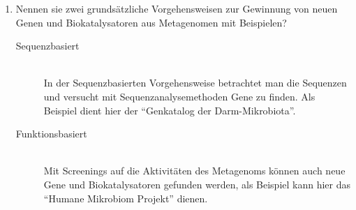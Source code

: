 \begin{enumerate}
	\item Nennen sie zwei grundsätzliche Vorgehensweisen zur Gewinnung von neuen Genen und Biokatalysatoren aus Metagenomen mit Beispielen?

		\begin{description}
			\item[Sequenzbasiert] \hfill \\
				In der Sequenzbasierten Vorgehensweise betrachtet man die Sequenzen und versucht
				mit Sequenzanalysemethoden Gene zu finden.
				Als Beispiel dient hier der ``Genkatalog der Darm-Mikrobiota''.
			\item[Funktionsbasiert] \hfill \\
				Mit Screenings auf die Aktivitäten des Metagenoms können auch neue Gene und Biokatalysatoren gefunden werden,
				als Beispiel kann hier das ``Humane Mikrobiom Projekt'' dienen.
		\end{description}
			

\end{enumerate}
